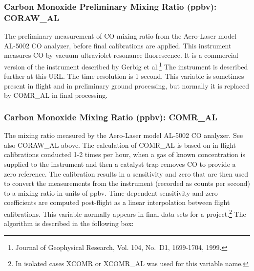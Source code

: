 \documentclass[
]{book}
\begin{document}
\hypertarget{coraw-al}{%
\subsubsection*{Carbon Monoxide Preliminary Mixing Ratio (ppbv): CORAW\_AL}\label{coraw-al}}

The preliminary measurement of CO mixing ratio from the Aero-Laser model AL-5002 CO analyzer, before final calibrations are applied. This instrument measures CO by vacuum ultraviolet resonance fluorescence. It is a commercial version of the instrument described by Gerbig et al.\footnote{Journal of Geophysical Research, Vol. 104, No.~D1, 1699-1704, 1999.}
The instrument is described further at this URL. The time resolution is 1 second. This variable is sometimes present in flight and in preliminary ground processing, but normally it is replaced by COMR\_AL in final processing.

\hypertarget{comr-al}{%
\subsubsection*{Carbon Monoxide Mixing Ratio (ppbv): COMR\_AL}\label{comr-al}}

The mixing ratio measured by the Aero-Laser model AL-5002 CO analyzer. See also CORAW\_AL above. The calculation of COMR\_AL is based on in-flight calibrations conducted 1-2 times per hour, when a gas of known concentration is supplied to the instrument and then a catalyst trap removes CO to provide a zero reference. The calibration results in a sensitivity and zero that are then used to convert the measurements from the instrument (recorded as counts per second) to a mixing ratio in units of ppbv. Time-dependent sensitivity and zero coefficients are computed post-flight as a linear interpolation between flight calibrations. This variable normally appears in final data sets for a project.\footnote{In isolated cases XCOMR or XCOMR\_AL was used for this variable name.}
The algorithm is described in the following box:
\end{document}
